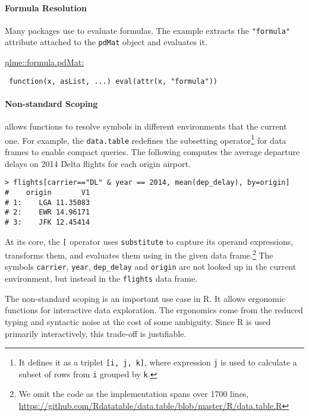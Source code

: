 \documentclass[screen,acmsmall]{acmart}%
\renewcommand{\k}[1]{\lstinline |#1|\xspace}
\begin{document}
\paragraph{Formula Resolution}
Many packages use \eval to evaluate formulas. The example extracts the
\k{"formula"} attribute attached to the \k{pdMat} object and evaluates it.

\begin{minipage}{.95\textwidth}
  \medskip\underline{\c{nlme::formula.pdMat}:}
\begin{lstlisting}
 function(x, asList, ...) eval(attr(x, "formula"))
\end{lstlisting}\medskip
\end{minipage}

\paragraph{Non-standard Scoping}

\Eval allows functions to resolve symbols in different environments that the
current one. For example, the \k{data.table} redefines the subsetting
operator\footnote{It defines it as a triplet \texttt{[i, j, k]}, where expression
  \texttt{j} is used to calculate a subset of rows from \texttt{i} grouped by \texttt{k}.}
for data frames to enable compact queries. The following  
computes the average departure delays on 2014 Delta flights for each
origin airport.

\begin{minipage}{.95\textwidth}
\medskip
\begin{lstlisting}
> flights[carrier=="DL" & year == 2014, mean(dep_delay), by=origin]
#    origin       V1
# 1:    LGA 11.35083
# 2:    EWR 14.96171
# 3:    JFK 12.45414
\end{lstlisting}\medskip
\end{minipage}

At its core, the \k{[} operator uses \k{substitute} to capture its operand
expressions, transforms them, and evaluates them using \eval in the given data
frame.\footnote{We omit the code as the implementation spans over 1700 lines,\\
  \indent \cf
\url{https://github.com/Rdatatable/data.table/blob/master/R/data.table.R}} The
symbols \k{carrier}, \k{year}, \k{dep_delay} and \k{origin} are not looked up
in the current environment, but instead in the \k{flights} data frame. 

The non-standard scoping is an important use case in R. It allows ergonomic
functions for interactive data exploration. The ergonomics come from the
reduced typing and syntactic noise at the cost of some ambiguity. Since R is
used primarily interactively, this trade-off is justifiable. 
\end{document}
